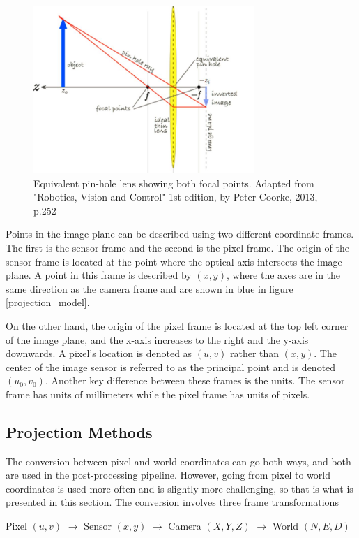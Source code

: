 \begin{figure}
	\centering
    \includegraphics[height=2.5in]{figures/projections_two_focal.jpg}
    \caption[Focal points]{Equivalent pin-hole lens showing both focal points. Adapted from "Robotics, Vision and Control" 1st edition, by Peter Coorke, 2013, p.252}
    \label{focal_points}
\end{figure} 

 Points in the image plane can be described using two different coordinate frames.  The first is the sensor frame and the second is the pixel frame.  The origin of the sensor frame is located at the point where the optical axis intersects the image plane.  A point in this frame is described by $(x,y)$, where the axes are in the same direction as the camera frame and are shown in blue in figure \ref{projection_model}.  
 
 On the other hand, the origin of the pixel frame is located at the top left corner of the image plane, and the x-axis increases to the right and the y-axis downwards.  A pixel's location is denoted as $(u,v)$ rather than $(x,y)$.  The center of the image sensor is referred to as the principal point and is denoted $(u_0,v_0)$. Another key difference between these frames is the units.  The sensor frame has units of millimeters while the pixel frame has units of pixels.

 \subsection{Projection Methods}

 The conversion between pixel and world coordinates can go both ways, and both are used in the post-processing pipeline.  However, going from pixel to world coordinates is used more often and is slightly more challenging, so that is what is presented in this section. The conversion involves three frame transformations   
\begin{center}
 Pixel $(u,v)$ $\rightarrow$ Sensor $(x,y)$ $\rightarrow$ Camera $(X,Y,Z)$ $\rightarrow$ World $(N,E,D)$
\end{center}
 
